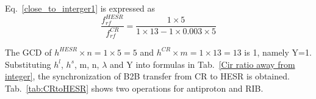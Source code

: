 Eq.~\ref{close_to_interger1} is expressed as
\begin{equation} 
\frac{f_{rf}^{HESR}}{f_{rf}^{CR}}=\frac{1\times 5}{1 \times 13- 1 \times 0.003\times 5}
\end{equation}

The GCD of $h^{HESR}\times n=1\times5=5$ and $h^{CR} \times m=1\times 13=13$ is 1, namely Y=1. Substituting $h^l$, $h^s$, m, n, $\lambda$ and Y into formulas in Tab.~\ref{Cir ratio away from integer}, the synchronization of B2B transfer from CR to HESR is obtained. Tab.~\ref{tab:CRtoHESR} shows two operations for antiproton and RIB.



